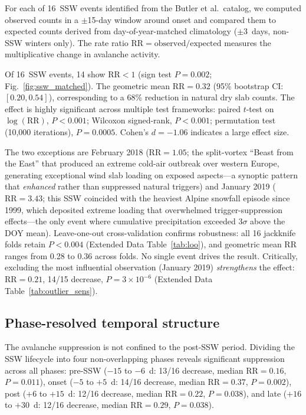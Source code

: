 \documentclass[11pt,letterpaper]{article}
\begin{document}
For each of 16~SSW events identified from the Butler et al.\ catalog\cite{Butler2015}, we computed observed counts in a $\pm$15-day window around onset and compared them to expected counts derived from day-of-year-matched climatology ($\pm$3~days, non-SSW winters only). The rate ratio $\mathrm{RR} = \mathrm{observed} / \mathrm{expected}$ measures the multiplicative change in avalanche activity.

Of 16~SSW events, 14 show $\mathrm{RR} < 1$ (sign test $P = 0.002$; Fig.~\ref{fig:ssw_matched}). The geometric mean $\mathrm{RR} = 0.32$ (95\% bootstrap CI: $[0.20, 0.54]$), corresponding to a 68\% reduction in natural dry slab counts. The effect is highly significant across multiple test frameworks: paired $t$-test on $\log(\mathrm{RR})$, $P < 0.001$; Wilcoxon signed-rank, $P < 0.001$; permutation test (10,000 iterations), $P = 0.0005$. Cohen's $d = -1.06$ indicates a large effect size.

The two exceptions are February 2018 ($\mathrm{RR} = 1.05$; the split-vortex ``Beast from the East'' that produced an extreme cold-air outbreak over western Europe, generating exceptional wind slab loading on exposed aspects---a synoptic pattern that \emph{enhanced} rather than suppressed natural triggers) and January 2019 ($\mathrm{RR} = 3.43$; this SSW coincided with the heaviest Alpine snowfall episode since 1999, which deposited extreme loading that overwhelmed trigger-suppression effects---the only event where cumulative precipitation exceeded $3\sigma$ above the DOY mean). Leave-one-out cross-validation confirms robustness: all 16 jackknife folds retain $P < 0.004$ (Extended Data Table~\ref{tab:loo}), and geometric mean RR ranges from 0.28 to 0.36 across folds. No single event drives the result. Critically, excluding the most influential observation (January 2019) \emph{strengthens} the effect: $\mathrm{RR} = 0.21$, 14/15 decrease, $P = 3 \times 10^{-6}$ (Extended Data Table~\ref{tab:outlier_sens}).

\subsection*{Phase-resolved temporal structure}

The avalanche suppression is not confined to the post-SSW period. Dividing the SSW lifecycle into four non-overlapping phases reveals significant suppression across all phases: pre-SSW ($-15$ to $-6$~d: 13/16 decrease, median $\mathrm{RR} = 0.16$, $P = 0.011$), onset ($-5$ to $+5$~d: 14/16 decrease, median $\mathrm{RR} = 0.37$, $P = 0.002$), post ($+6$ to $+15$~d: 12/16 decrease, median $\mathrm{RR} = 0.22$, $P = 0.038$), and late ($+16$ to $+30$~d: 12/16 decrease, median $\mathrm{RR} = 0.29$, $P = 0.038$).
\end{document}
